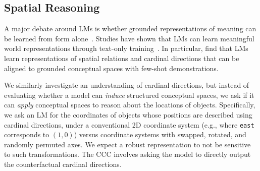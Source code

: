 \subsection{Spatial Reasoning} \label{sec:spatial-task}

A major debate around LMs is whether grounded representations of meaning can be learned from form alone~\citep{bender-koller-2020-climbing, piantadosi2022meaning,mollo2023vector}. Studies have shown that LMs can learn meaningful world representations through text-only training~\citep{abdou-etal-2021-language, li2023emergent, jin2023evidence}.
In particular, \citet{patel2022mapping} find that LMs learn representations of spatial relations and cardinal directions that can be aligned to grounded conceptual spaces with few-shot demonstrations.

We similarly investigate an understanding of cardinal directions, but instead of evaluating whether a model can \emph{induce} structured conceptual spaces, we ask if it can \emph{apply}  conceptual spaces to reason about the locations of objects. Specifically, we ask an LM for the coordinates of objects whose positions are described using cardinal directions, under a conventional 2D coordinate system (e.g., where \texttt{east} corresponds to $(1, 0)$)
versus coordinate systems with swapped, rotated, and randomly permuted axes. We expect a robust representation to not be sensitive to such transformations.
The CCC involves asking the model to directly output the counterfactual cardinal directions.


 
